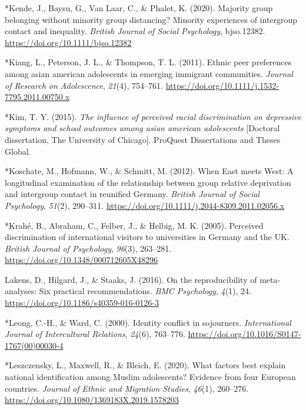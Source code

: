 \documentclass[12pt, letterpaper]{article}
\begin{document}
\leavevmode\hypertarget{ref-4002}{}%
*Kende, J., Baysu, G., Van Laar, C., \& Phalet, K. (2020). Majority
group belonging without minority group distancing? Minority experiences
of intergroup contact and inequality. \emph{British Journal of Social
Psychology}, bjso.12382. \url{https://doi.org/10.1111/bjso.12382}

\leavevmode\hypertarget{ref-1525}{}%
*Kiang, L., Peterson, J. L., \& Thompson, T. L. (2011). Ethnic peer
preferences among asian american adolescents in emerging immigrant
communities. \emph{Journal of Research on Adolescence}, \emph{21}(4),
754--761. \url{https://doi.org/10.1111/j.1532-7795.2011.00750.x}

\leavevmode\hypertarget{ref-830}{}%
*Kim, T. Y. (2015). \emph{The influence of perceived racial
discrimination on depressive symptoms and school outcomes among asian
american adolescents} {[}Doctoral dissertation, The University of
Chicago{]}. ProQuest Dissertations and Theses Global.

\leavevmode\hypertarget{ref-401}{}%
*Koschate, M., Hofmann, W., \& Schmitt, M. (2012). When East meets West:
A longitudinal examination of the relationship between group relative
deprivation and intergroup contact in reunified Germany. \emph{British
Journal of Social Psychology}, \emph{51}(2), 290--311.
\url{https://doi.org/10.1111/j.2044-8309.2011.02056.x}

\leavevmode\hypertarget{ref-45}{}%
*Krahé, B., Abraham, C., Felber, J., \& Helbig, M. K. (2005). Perceived
discrimination of international visitors to universities in Germany and
the UK. \emph{British Journal of Psychology}, \emph{96}(3), 263--281.
\url{https://doi.org/10.1348/000712605X48296}

\leavevmode\hypertarget{ref-lakens_reproducibility_2016}{}%
Lakens, D., Hilgard, J., \& Staaks, J. (2016). On the reproducibility of
meta-analyses: Six practical recommendations. \emph{BMC Psychology},
\emph{4}(1), 24. \url{https://doi.org/10.1186/s40359-016-0126-3}

\leavevmode\hypertarget{ref-1993}{}%
*Leong, C.-H., \& Ward, C. (2000). Identity conflict in sojourners.
\emph{International Journal of Intercultural Relations}, \emph{24}(6),
763--776. \url{https://doi.org/10.1016/S0147-1767(00)00030-4}

\leavevmode\hypertarget{ref-3134}{}%
*Leszczensky, L., Maxwell, R., \& Bleich, E. (2020). What factors best
explain national identification among Muslim adolescents? Evidence from
four European countries. \emph{Journal of Ethnic and Migration Studies},
\emph{46}(1), 260--276.
\url{https://doi.org/10.1080/1369183X.2019.1578203}
\end{document}
